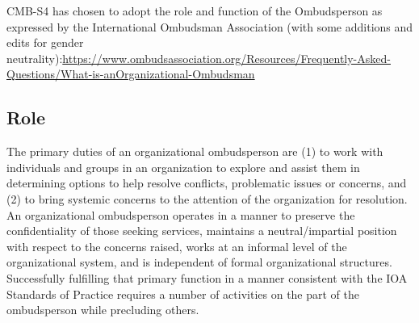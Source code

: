 \documentclass[12pt]{article}
\begin{document}
CMB-S4  has chosen to adopt the role and function of the Ombudsperson as expressed by the International Ombudsman Association (with some additions and edits for gender neutrality):\url{https://www.ombudsassociation.org/Resources/Frequently-Asked-Questions/What-is-anOrganizational-Ombudsman}

\subsection{Role}

The primary duties of an organizational ombudsperson are (1) to work with individuals and groups in an organization to explore and assist them in determining options to help resolve conflicts, problematic issues or concerns, and (2) to bring systemic concerns to the attention of the organization for resolution. An organizational ombudsperson operates in a manner to preserve the confidentiality of those seeking services, maintains a neutral/impartial position with respect to the concerns raised, works at an informal level of the organizational system, and is independent of formal organizational structures. Successfully fulfilling that primary function in a manner consistent with the IOA Standards of Practice requires a number of activities on the part of the ombudsperson while precluding others.
\end{document}

